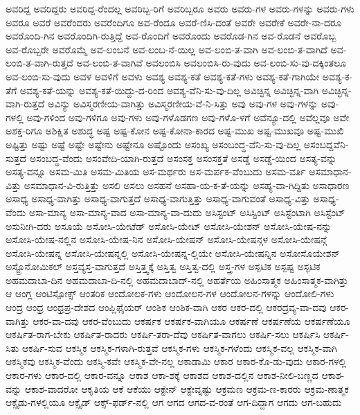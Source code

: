 {ಅವರಿದ್ದ
ಅವರಿದ್ದರು
ಅವರಿದ್ದ-ರೆಂದಲ್ಲ
ಅವರಿಬ್ಬ-ರಿಗೆ
ಅವರಿಬ್ಬರೂ
ಅವರು
ಅವರು-ಗಳ
ಅವರು-ಗಳನ್ನು
ಅವರು-ಗಳು
ಅವರೂ
ಅವರೆ
ಅವರೆಂದರು
ಅವರೆಂದಿಗೂ
ಅವ-ರೆಂದೂ
ಅವರೆ-ಣಿಸಿ-ದಂತೆ
ಅವರೇ
ಅವರೇಕೆ
ಅವರೇ-ನಾ-ದರೂ
ಅವರೊಂದಿ-ಗಿನ
ಅವರೊಂದಿಗಿ-ರುತ್ತಿದ್ದೆ
ಅವ-ರೊಂದಿಗೆ
ಅವರೊಂದು
ಅವರೊಡ-ಗಿನ
ಅವ-ರೊಡನೆ
ಅವರೊಬ್ಬ
ಅವ-ರೊಬ್ಬರೇ
ಅವರೊಮ್ಮೆ
ಅವ-ಲಂಬನೆ
ಅವ-ಲಂಬ-ನೆ-ಯಿಲ್ಲ
ಅವ-ಲಂಬಿ-ತ-ವಾಗಿ
ಅವ-ಲಂಬಿ-ತ-ವಾಗಿದೆ
ಅವ-ಲಂಬಿ-ತ-ವಾಗಿ-ರುತ್ತದೆ
ಅವ-ಲಂಬಿ-ತ-ವಾಗಿವೆ
ಅವಲಂಬಿಸಿ
ಅವಲಂಬಿಸಿ-ರು-ವುದು
ಅವ-ಲಂಬಿ-ಸು-ವು-ದಕ್ಕಿಂತಲೂ
ಅವ-ಲಂಬಿ-ಸು-ವುದು
ಅವಳ
ಅವಳಿಗೆ
ಅವಳು
ಅವಶ್ಯ
ಅವಶ್ಯ-ಕತೆ
ಅವಶ್ಯ-ಕತೆ-ಗಳು
ಅವಶ್ಯ-ಕತೆ-ಗಾಗಿಯೇ
ಅವಶ್ಯ-ಕ-ತೆಗೆ
ಅವಶ್ಯ-ಕತೆ-ಯನ್ನು
ಅವಶ್ಯ-ಕತೆ-ಯಿದ್ದು-ದ-ರಿಂದ
ಅವಶ್ಯ-ವೆನಿ-ಸು-ವು-ದಿಲ್ಲ
ಅವಿಚ್ಛಿನ್ನ
ಅವಿಚ್ಛಿನ್ನ-ವಾಗಿ
ಅವಿಚ್ಛಿನ್ನ-ವಾಗಿ-ರುತ್ತದೆ
ಅವಿನ್ಯು
ಅವಿಸ್ಮರಣೀಯ-ವಾಗಿತ್ತು
ಅವಿಸ್ಮರಣೀಯ-ವೆ-ನಿ-ಸಿತ್ತು
ಅವು
ಅವು-ಗಳ
ಅವು-ಗಳನ್ನು
ಅವು-ಗಳಲ್ಲಿ
ಅವು-ಗಳಿಂದ
ಅವು-ಗಳಿಗೂ
ಅವು-ಗಳು
ಅವು-ಗಳೊಡಗಣ
ಅವು-ಗಳೊ-ಳಗೆ
ಅವೆನ್ಯೂ-ದಲ್ಲಿ
ಅವೆಲ್ಲವೂ
ಅವೇ
ಅಶಕ್ತ-ರಿಗೂ
ಅಶಿಕ್ಷಿತ
ಅಶುದ್ಧ
ಅಷ್ಟ
ಅಷ್ಟ-ಕೋನ
ಅಷ್ಟ-ಕೋನಾ-ಕಾರದ
ಅಷ್ಟ-ಮುಖ
ಅಷ್ಟ-ಮುಖವೂ
ಅಷ್ಟ-ಮುಖಿ
ಅಷ್ಟಿತ್ತು
ಅಷ್ಟು
ಅಷ್ಟೆ
ಅಷ್ಟೇ
ಅಷ್ಟೇನು
ಅಷ್ಟೇನೂ
ಅಷ್ಟೊಂದು
ಅಸಂಖ್ಯ
ಅಸಂಬಂದ್ಧ-ವೆನಿ-ಸು-ವು-ದಿಲ್ಲ
ಅಸಂಬದ್ದವೆನಿ-ಸುತ್ತದೆ
ಅಸಂಬದ್ಧ-ವೆಂದು
ಅಸಂವೇದಿ-ಯಾಗಿ-ರುತ್ತದೆ
ಅಸಂಸಕ್ತ
ಅಸಂಸಕ್ತತೆ
ಅಸಡ್ಡೆ
ಅಸಡ್ಡೆ-ಯಿಂದ
ಅಸತ್ಯ-ವನ್ನು
ಅಸತ್ಯ-ವನ್ನೂ
ಅಸಮ-ಮಿತಿ
ಅಸಮ-ಮಿತಿಯ
ಅಸ-ಮರ್ಥರು
ಅಸ-ಮರ್ಪಕ-ವೆಂಬುದು
ಅಸಮ-ವರ್ತಿ
ಅಸಮಾಧಾನ-ವಿತ್ತು
ಅಸಮಾಧಾನ-ವಿ-ರುತ್ತಿತ್ತು
ಅಸಲಿ
ಅಸಲು
ಅಸಹನೆ
ಅಸಹಾ-ಯ-ಕ-ತೆ-ಯನ್ನು
ಅಸಹ್ಯ-ವಾ-ಗಿದ್ದಿತು
ಅಸಾಧಾರಣ
ಅಸಾಧ್ಯ
ಅಸಾಧ್ಯ-ವಾಗಿತ್ತು
ಅಸಾಧ್ಯ-ವಾಗುತ್ತದೆ
ಅಸಾಧ್ಯ-ವಾಗುತ್ತಿತ್ತು
ಅಸಾಧ್ಯ-ವಾಗುವಂತೆ
ಅಸಾಧ್ಯ-ವಿತ್ತು
ಅಸಾಧ್ಯ-ವೆಂದು
ಅಸಾ-ಮಾನ್ಯ
ಅಸಾ-ಮಾನ್ಯ-ವಾದ
ಅಸಾ-ಮಾನ್ಯ-ವಾ-ದುದು
ಅಸಿಸ್ಟಂಟ್
ಅಸಿಸ್ಟಿಂಟ್
ಅಸಿಸ್ಟೆಂಟಾಗಿ
ಅಸಿಸ್ಟೆಂಟ್
ಅಸುನೀಗಿ-ದರು
ಅಸೂಯೆ
ಅಸೋಸಿ-ಯೇಟೆಡ್
ಅಸೋಸಿ-ಯೇಟ್
ಅಸೋಸಿ-ಯೇಶನ್
ಅಸೋಸಿ-ಯೇಷ-ನನ್ನು
ಅಸೋಸಿ-ಯೇಷ-ನಲ್ಲಿನ
ಅಸೋಸಿ-ಯೇಷ-ನಿನ
ಅಸೋಸಿ-ಯೇಷನ್
ಅಸೋಸಿ-ಯೇಷನ್ಗಳ
ಅಸೋಸಿ-ಯೇಷನ್ಗೆ
ಅಸೋಸಿ-ಯೇಷನ್ನ
ಅಸೋಸಿ-ಯೇಷನ್ನಲ್ಲಿ
ಅಸೋಸಿ-ಯೇಷನ್ನ-ಲ್ಲಿಯೇ
ಅಸೋಸಿ-ಯೇಷನ್ನಿನ
ಅಸೋಸೊಯೇಶನ್
ಅಸ್ಟ್ರೊನೋಮಿಕಲ್
ಅಸ್ತವ್ಯಸ್ತ-ವಾಗುತ್ತದೆ
ಅಸ್ತಿತ್ತ್ವಕ್ಕೆ
ಅಸ್ತಿತ್ವ
ಅಸ್ತಿತ್ವ-ದಲ್ಲಿ
ಅಸ್ತ್ರ-ಗಳ
ಅಸ್ಪಟಿಕ
ಅಸ್ಪಷ್ಟ
ಅಸ್ಫಟಿಕ
ಅಹಮದಾಬಾ-ದಿನ
ಅಹಮದಾಬಾ-ದಿ-ನಲ್ಲಿ
ಅಹಮದಾಬಾದ್-ನಲ್ಲಿ
ಅಹರ್ತೆಯ
ಅಹಿಂಸಾತ್ಮಕ
ಅಹಿಂಸಾತ್ಮಕ-ವಾಗಿತ್ತು
ಆ
ಆಂಗ್ಲ
ಆಂಟಿಸ್ಪೋಕ್ಸ್
ಆಂತರಿಕ
ಆಂದೋಲಕ-ಗಳು
ಆಂದೋಲನ-ಗಳ
ಆಂದೋಲನ-ಗಳನ್ನು
ಆಂದೋಲಿ-ಗಳು
ಆಂದ್ರ
ಆಂಧ್ರ
ಆಂಧ್ರಪ್ರ-ದೇಶದ
ಆಂಪ್ಲಿಫೈಯರ್
ಆಂಶಿಕ
ಆಂಶಿಕ-ವಾಗಿ
ಆಕರ
ಆಕರ-ದಲ್ಲಿ
ಆಕರದ್ರವ್ಯ-ವಾ-ದವು
ಆಕರ-ವಾಗಿತ್ತು
ಆಕರ-ವಾ-ದವು
ಆಕರ-ವೆಂಬುದು
ಆಕರ್ಷಕ
ಆಕರ್ಷಕ-ವಾಗಿಯೂ
ಆಕರ್ಷಣೆ
ಆಕರ್ಷಣೆಯ
ಆಕರ್ಷಣೆಯೂ
ಆಕರ್ಷಿತ-ರಾಗ-ಬೇಕು
ಆಕರ್ಷಿತ-ರಾದರು
ಆಕರ್ಷಿ-ತರಾ-ದೆವು
ಆಕರ್ಷಿತ-ವಾಗಲು
ಆಕರ್ಷಿ-ಸಲು
ಆಕರ್ಷಿಸಿ
ಆಕರ್ಷಿ-ಸಿತು
ಆಕರ್ಷಿ-ಸುವ
ಆಕಸ್ಮಿಕ
ಆಕಸ್ಮಿಕ-ಗಳಾಗಿ-ರುತ್ತವೆ
ಆಕಸ್ಮಿಕ-ಗಳು
ಆಕಸ್ಮಿಕ-ಗಳೆಂದು
ಆಕಸ್ಮಿಕ-ವಲ್ಲ
ಆಕಸ್ಮಿಕ-ವಾಗಿ
ಆಕಸ್ಮಿಕವು
ಆಕಸ್ಮಿಕ-ವೆಂದು
ಆಕಸ್ಮಿ-ಕವೇ
ಆಕಸ್ಮಿಕ-ವೇ-ನಲ್ಲ
ಆಕಾಡಾಮಿ
ಆಕಾರ
ಆಕಾರ-ಕೊ-ಡು-ವುದು
ಆಕಾರ-ಗಳಲ್ಲಿ
ಆಕಾರ-ಗಳು
ಆಕಾರ-ದಲ್ಲಿ
ಆಕಾರ-ವನ್ನೂ
ಆಕಾಶ
ಆಕಾ-ಶಕ್ಕೆ
ಆಕಾಶದ
ಆಕಾಶ-ದಲ್ಲಿನ
ಆಕಾಶ-ನೀಲಿ-ಬಣ್ಣದ
ಆಕಾಶ-ವನ್ನು
ಆಕಾಶ-ವಾದರೋ
ಆಕೃತಿಯ
ಆಕೆ
ಆಕೆಯು
ಆಕ್ಟೇನ್
ಆಕ್ಟೇವ್ನಷ್ಟು
ಆಕ್ರಮಣ
ಆಕ್ರಮ-ಣ-ಕಾರರು
ಆಕ್ರಮ-ಣಾತ್ಮಕ
ಆಕ್ಸೈಡು-ಗಳಲ್ಲಿಯೂ
ಆಕ್ಸೈಡ್
ಆಕ್ಸ್-ಫರ್ಡ್-ನಲ್ಲಿ
ಆಗ
ಆಗದ
ಆಗದ-ವ-ರಂತೆ
ಆಗ-ದಿದ್ದಾಗ
ಆಗದು
ಆಗ-ಬಹುದು
}
